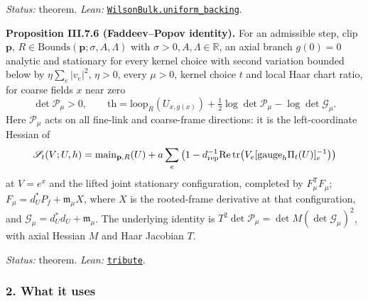 \documentclass[
  letterpaper,
  11pt]{article}
\begin{document}
\emph{Status:} theorem. \emph{Lean:}
\href{https://github.com/yang-mills-group/OpenAI-YM-20261028/blob/3456e5e75cf8d4cd558955a5c7638fba2d68f464/YM/WilsonBulk/Spectral/Backing.lean\#L54-L66}{\texttt{WilsonBulk.uniform\_backing}}.

\textbf{Proposition III.7.6 (Faddeev--Popov identity).} For an
admissible step, clip \(\mathbf p\),
\(R\in\mathrm{Bounds}(\mathbf p;\sigma,A,\Lambda)\) with
\(\sigma>0,A,\Lambda\in\mathbb R\), an axial branch \(g(0)=0\) analytic
and stationary for every kernel choice with second variation bounded
below by \(\eta\sum_e|v_e|^2\), \(\eta>0\), every \(\mu>0\), kernel
choice \(t\) and local Haar chart ratio, for coarse fields \(x\) near
zero
\[\det\mathcal P_\mu>0,\qquad\mathrm{th}=\mathrm{loop}_R(U_{x,g(x)})+\tfrac12\log\det\mathcal P_\mu-\log\det\mathcal G_\mu.\]
Here \(\mathcal P_\mu\) acts on all fine-link and coarse-frame
directions: it is the left-coordinate Hessian of
\[\mathscr S_t(V;U,h)=\mathrm{main}_{\mathbf p,R}(U)+a\sum_e\left(1-d_{\rm rep}^{-1}\mathrm{Re}\,\mathrm{tr}\big(V_e[\mathrm{gauge}_h\Pi_t(U)]_e^{-1}\big)\right)\]
at \(V=e^x\) and the lifted joint stationary configuration, completed by
\(F_\mu^{\mathsf T}F_\mu\); \(F_\mu=d_U^*P_f+\mathfrak m_\mu X\), where
\(X\) is the rooted-frame derivative at that configuration, and
\(\mathcal G_\mu=d_U^*d_U+\mathfrak m_\mu\). The underlying identity is
\(T^2\det\mathcal P_\mu=\det M(\det\mathcal G_\mu)^2\), with axial
Hessian \(M\) and Haar Jacobian \(T\).

\emph{Status:} theorem. \emph{Lean:}
\href{https://github.com/yang-mills-group/OpenAI-YM-20261028/blob/3456e5e75cf8d4cd558955a5c7638fba2d68f464/YM/Next/STATIONARY/Joint/HaarJac.lean\#L177-L202}{\texttt{tribute}}.

\subsubsection{2. What it uses}\label{what-it-uses-9}
\end{document}
